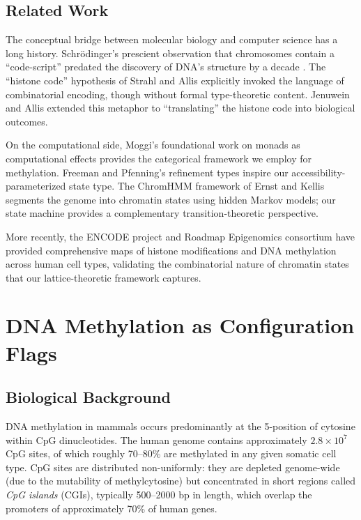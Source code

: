 \documentclass[12pt,a4paper]{article}
\begin{document}
\subsection{Related Work}

The conceptual bridge between molecular biology and computer science has a long history. Schr\"{o}dinger's prescient observation that chromosomes contain a ``code-script'' predated the discovery of DNA's structure by a decade \cite{waddington1942}. The ``histone code'' hypothesis of Strahl and Allis \cite{strahl2000} explicitly invoked the language of combinatorial encoding, though without formal type-theoretic content. Jenuwein and Allis \cite{jenuwein2001} extended this metaphor to ``translating'' the histone code into biological outcomes.

On the computational side, Moggi's foundational work on monads as computational effects \cite{moggi1991} provides the categorical framework we employ for methylation. Freeman and Pfenning's refinement types \cite{freeman1991} inspire our accessibility-parameterized state type. The ChromHMM framework of Ernst and Kellis \cite{ernst2012} segments the genome into chromatin states using hidden Markov models; our state machine provides a complementary transition-theoretic perspective.

More recently, the ENCODE project \cite{encode2012} and Roadmap Epigenomics consortium have provided comprehensive maps of histone modifications and DNA methylation across human cell types, validating the combinatorial nature of chromatin states that our lattice-theoretic framework captures.

\section{DNA Methylation as Configuration Flags}
\label{sec:methylation}

\subsection{Biological Background}

DNA methylation in mammals occurs predominantly at the 5-position of cytosine within CpG dinucleotides. The human genome contains approximately $2.8 \times 10^7$ CpG sites, of which roughly 70--80\% are methylated in any given somatic cell type. CpG sites are distributed non-uniformly: they are depleted genome-wide (due to the mutability of methylcytosine) but concentrated in short regions called \emph{CpG islands} (CGIs), typically 500--2000 bp in length, which overlap the promoters of approximately 70\% of human genes.
\end{document}
